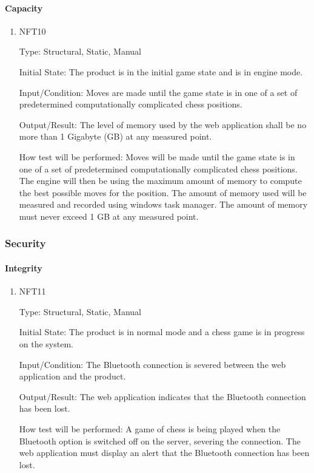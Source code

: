 \documentclass[12pt, titlepage]{article}
\begin{document}
\paragraph{Capacity}
\begin{enumerate}
    \item{NFT10}

        Type: Structural, Static, Manual
                            
        Initial State: The product is in the initial game state and is in engine mode.
                            
        Input/Condition: Moves are made until the game state is in one of a set of predetermined computationally complicated chess positions.
                            
        Output/Result: The level of memory used by the web application shall be no more than 1 Gigabyte (GB) at any measured point.
                            
        How test will be performed: Moves will be made until the game state is in one of a set of predetermined computationally complicated chess positions. 
            The engine will then be using the maximum amount of memory to compute the best possible moves for the position. The amount of memory used will be 
            measured and recorded using windows task manager. The amount of memory must never exceed 1 GB at any measured point.
\end{enumerate}

\subsubsection{Security}
\paragraph{Integrity}
\begin{enumerate}
    \item{NFT11}

        Type: Structural, Static, Manual
                            
        Initial State: The product is in normal mode and a chess game is in progress on the system.
                            
        Input/Condition: The Bluetooth connection is severed between the web application and the product.
                            
        Output/Result: The web application indicates that the Bluetooth connection has been lost.
                            
        How test will be performed: A game of chess is being played when the Bluetooth option is switched off on the server, severing the connection.
            The web application must display an alert that the Bluetooth connection has been lost.
\end{enumerate}
\end{document}
